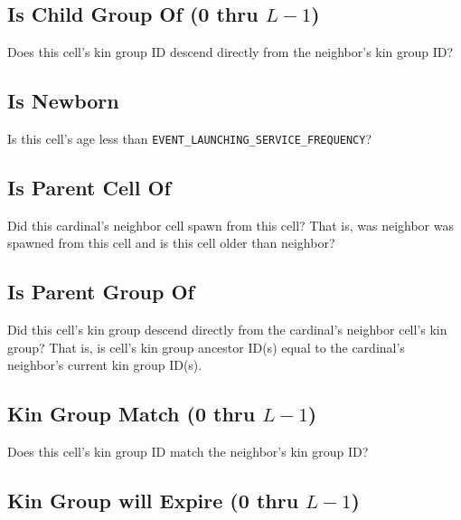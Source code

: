 \subsection{Is Child Group Of (0 thru $L-1$)}


Does this cell's kin group ID descend directly from the neighbor's kin group ID?

\subsection{Is Newborn}


Is this cell's age less than \texttt{EVENT\_LAUNCHING\_SERVICE\_FREQUENCY}?

\subsection{Is Parent Cell Of}


Did this cardinal's neighbor cell spawn from this cell?
That is, was neighbor was spawned from this cell and is this cell older than neighbor?

\subsection{Is Parent Group Of}


Did this cell's kin group descend directly from the cardinal's neighbor cell's kin group?
That is, is cell's kin group ancestor ID(s) equal to the cardinal's neighbor's current kin group ID(s).

\subsection{Kin Group Match (0 thru $L-1$)}


Does this cell's kin group ID match the neighbor's kin group ID?

\subsection{Kin Group will Expire (0 thru $L-1$)}

